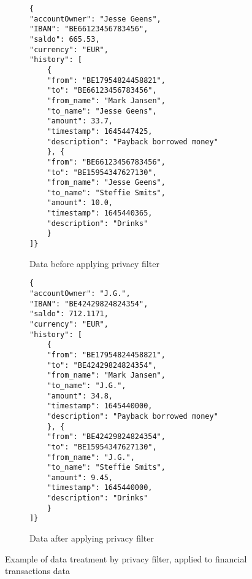 \begin{figure}[h]
\centering
\begin{subfigure}{.5\textwidth}
  \centering
  \begin{verbatim}
{
"accountOwner": "Jesse Geens",
"IBAN": "BE66123456783456",
"saldo": 665.53,
"currency": "EUR",
"history": [
    {
    "from": "BE17954824458821",
    "to": "BE66123456783456",
    "from_name": "Mark Jansen",
    "to_name": "Jesse Geens",
    "amount": 33.7,
    "timestamp": 1645447425,
    "description": "Payback borrowed money"
    }, {
    "from": "BE66123456783456",
    "to": "BE15954347627130",
    "from_name": "Jesse Geens",
    "to_name": "Steffie Smits",
    "amount": 10.0,
    "timestamp": 1645440365,
    "description": "Drinks"
    }
]}
  \end{verbatim}
  \caption{Data before applying privacy filter}
  \label{fig:data-before-privacy-filter}
\end{subfigure}%
\begin{subfigure}{.5\textwidth}
  \centering
  \begin{verbatim}
{
"accountOwner": "J.G.",
"IBAN": "BE42429824824354",
"saldo": 712.1171,
"currency": "EUR",
"history": [
    {
    "from": "BE17954824458821",
    "to": "BE42429824824354",
    "from_name": "Mark Jansen",
    "to_name": "J.G.",
    "amount": 34.8,
    "timestamp": 1645440000,
    "description": "Payback borrowed money"
    }, {
    "from": "BE42429824824354",
    "to": "BE15954347627130",
    "from_name": "J.G.",
    "to_name": "Steffie Smits",
    "amount": 9.45,
    "timestamp": 1645440000,
    "description": "Drinks"
    }
]}
  \end{verbatim}
  \caption{Data after applying privacy filter}
  \label{fig:data-after-privacy-filter}
\end{subfigure}
\caption{Example of data treatment by privacy filter, applied to financial transactions data}
\label{fig:example-treatment-privacy-filter}
\end{figure}